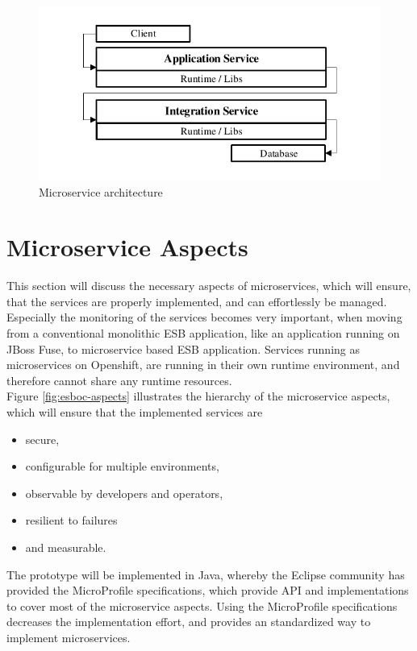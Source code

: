 \begin{figure}[htbp]
	\centering
	\includegraphics[scale=1]{images/esboc-design-microservice.pdf}
	\caption{Microservice architecture}
	\label{fig:esboc-design-services}
\end{figure}

\section{Microservice Aspects}
\label{sec:esboc-aspects}
This section will discuss the necessary aspects of microservices, which will ensure, that the services are properly implemented, and can effortlessly be managed. Especially the monitoring of the services becomes very important, when moving from a conventional monolithic ESB application, like an application running on JBoss Fuse, to microservice based ESB application. Services running as microservices on Openshift, are running in their own runtime environment, and therefore cannot share any runtime resources. \\

Figure \vref{fig:esboc-aspects} illustrates the hierarchy of the microservice aspects, which will ensure that the implemented services are
\begin{itemize}
	\item secure,
	\item configurable for multiple environments,
	\item observable by developers and operators,
	\item resilient to failures
	\item and measurable.
\end{itemize}

The prototype will be implemented in Java, whereby the Eclipse community has provided the MicroProfile specifications, which provide API and implementations to cover most of the microservice aspects. Using the MicroProfile specifications decreases the implementation effort, and provides an standardized way to implement microservices\cite{EclipseMicroprofileCharter2017}.
\newpage

